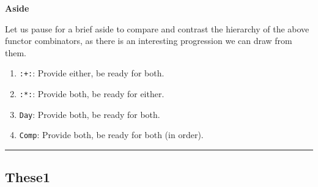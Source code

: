 \documentclass[]{article}
\begin{document}
\textbf{Aside}

Let us pause for a brief aside to compare and contrast the hierarchy of the
above functor combinators, as there is an interesting progression we can draw
from them.

\begin{enumerate}
\def\labelenumi{\arabic{enumi}.}
\tightlist
\item
  \texttt{:+:}: Provide either, be ready for both.
\item
  \texttt{:*:}: Provide both, be ready for either.
\item
  \texttt{Day}: Provide both, be ready for both.
\item
  \texttt{Comp}: Provide both, be ready for both (in order).
\end{enumerate}

\begin{center}\rule{0.5\linewidth}{\linethickness}\end{center}

\hypertarget{these1}{%
\subsection{These1}\label{these1}}
\end{document}
